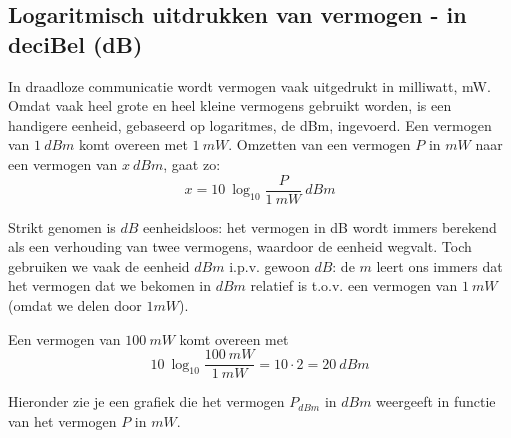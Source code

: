 

\subsection{Logaritmisch uitdrukken van vermogen - in deciBel (dB)}
In draadloze communicatie wordt vermogen vaak uitgedrukt in milliwatt, mW.
Omdat vaak heel grote en heel kleine vermogens gebruikt worden, is een handigere eenheid, gebaseerd op logaritmes, de dBm, ingevoerd.
Een vermogen van $1 ~dBm$ komt overeen met $1~mW$. 
Omzetten van een vermogen $P$ in $mW$ naar een vermogen van $x~dBm$, gaat zo:
\begin{equation*}
    x = 10 ~ \log_{10} \frac{P}{1~mW} ~dBm
\end{equation*}

Strikt genomen is $dB$ eenheidsloos: het vermogen in dB wordt immers berekend als een verhouding van twee vermogens, waardoor de eenheid wegvalt. Toch gebruiken we vaak de eenheid $dBm$ i.p.v. gewoon $dB$: de $m$ leert ons immers dat het vermogen dat we bekomen in $dBm$ relatief is t.o.v. een vermogen van $1~mW$ (omdat we delen door $1mW$).

Een vermogen van $100~mW$ komt overeen met 
\begin{equation*}
    10 ~ \log_{10} \frac{100~mW}{1~mW} = 10 \cdot 2 = 20~dBm
\end{equation*}

Hieronder zie je een grafiek die het vermogen $P_{dBm}$ in $dBm$ weergeeft in functie van het vermogen $P$ in $mW$.

\begin{center}
\end{center}

